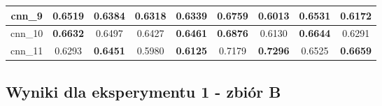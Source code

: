 \begin{table}[p]
\begin{tabular}{|c|c|c|c|c|c|c|c|c|}
        cnn\_9   & \textbf{0.6519}                     & 0.6384                              & 0.6318                              & \textbf{0.6339}                     & \textbf{0.6759}                     & 0.6013                              & \textbf{0.6531}                     & 0.6172                              \\ \hline
        cnn\_10  & \textbf{0.6632}                     & 0.6497                              & 0.6427                              & \textbf{0.6461}                     & \textbf{0.6876}                     & 0.6130                              & \textbf{0.6644}                     & 0.6291                              \\ \hline
        cnn\_11  & 0.6293                              & \textbf{0.6451}                     & 0.5980                              & \textbf{0.6125}                     & 0.7179                              & \textbf{0.7296}                     & 0.6525                              & \textbf{0.6659}                     \\ \hline
    \end{tabular}
\end{table}


\newpage %
\subsection{\label{wyniki_eksperymentow_eks_1b}Wyniki dla eksperymentu 1 - zbiór B}


